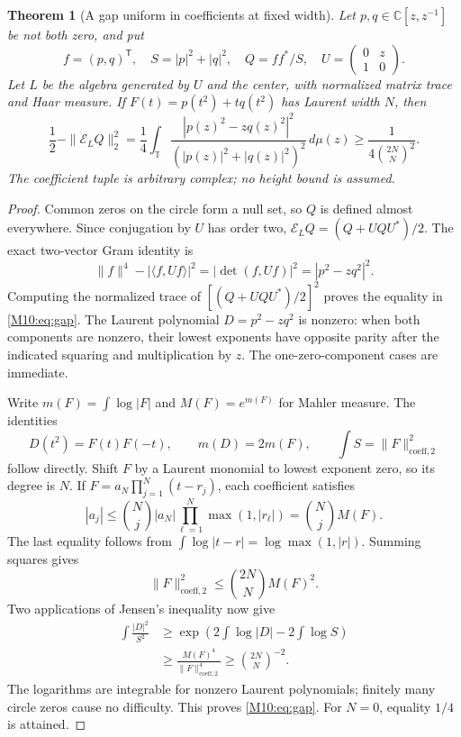\documentclass[11pt,a4paper,oneside]{report}
\newtheorem{theorem}{Theorem}[section]
\theoremstyle{definition}
\theoremstyle{remark}
\newcommand{\C}{\mathbb C}
\newcommand{\T}{\mathbb T}
\begin{document}
\begin{theorem}[A gap uniform in coefficients at fixed width]\label{M10:thm:gap}
Let $p,q\in\C[z,z^{-1}]$ be not both zero, and put
\[
f=(p,q)^{\mathsf T},\quad S=|p|^2+|q|^2,
\quad Q=ff^*/S,\quad
U=\begin{pmatrix}0&z\\1&0\end{pmatrix}.
\]
Let $L$ be the algebra generated by $U$ and the center, with
normalized matrix trace and Haar measure. If
$F(t)=p(t^2)+tq(t^2)$ has Laurent width $N$, then
\begin{equation}\label{M10:eq:gap}
\frac12-\|\mathcal E_LQ\|_2^2
=\frac14\int_\T
\frac{|p(z)^2-zq(z)^2|^2}{(|p(z)|^2+|q(z)|^2)^2}\,d\mu(z)
\ge\frac1{4\binom{2N}{N}^2}.
\end{equation}
The coefficient tuple is arbitrary complex; no height bound is
assumed.
\end{theorem}
\begin{proof}
Common zeros on the circle form a null set, so $Q$ is defined
almost everywhere. Since conjugation by $U$ has order two,
$\mathcal E_LQ=(Q+UQU^*)/2$. The exact two-vector Gram identity is
\[
\|f\|^4-|\langle f,Uf\rangle|^2
=|\det(f,Uf)|^2=|p^2-zq^2|^2.
\]
Computing the normalized trace of
$[(Q+UQU^*)/2]^2$ proves the equality in \eqref{M10:eq:gap}.
The Laurent polynomial $D=p^2-zq^2$ is nonzero: when both
components are nonzero, their lowest exponents have opposite
parity after the indicated squaring and multiplication by $z$.
The one-zero-component cases are immediate.

Write $m(F)=\int\log|F|$ and $M(F)=e^{m(F)}$ for Mahler
measure. The identities
\[
D(t^2)=F(t)F(-t),\qquad m(D)=2m(F),\qquad
\int S=\|F\|_{\mathrm{coeff},2}^2
\]
follow directly. Shift $F$ by a Laurent monomial to lowest
exponent zero, so its degree is $N$. If
$F=a_N\prod_{j=1}^N(t-r_j)$, each coefficient satisfies
\[
|a_j|\le\binom Nj |a_N|\prod_{\ell=1}^N\max(1,|r_\ell|)
=\binom Nj M(F).
\]
The last equality follows from
$\int\log|t-r|=\log\max(1,|r|)$. Summing squares gives
\[
\|F\|_{\mathrm{coeff},2}^2
\le\binom{2N}{N}M(F)^2.
\]
Two applications of Jensen's inequality now give
\begin{align*}
\int\frac{|D|^2}{S^2}
&\ge\exp\left(2\int\log|D|-2\int\log S\right)\\
&\ge\frac{M(F)^4}{\|F\|_{\mathrm{coeff},2}^4}
\ge\binom{2N}{N}^{-2}.
\end{align*}
The logarithms are integrable for nonzero Laurent polynomials;
finitely many circle zeros cause no difficulty. This proves
\eqref{M10:eq:gap}. For $N=0$, equality $1/4$ is attained.
\end{proof}
\end{document}
